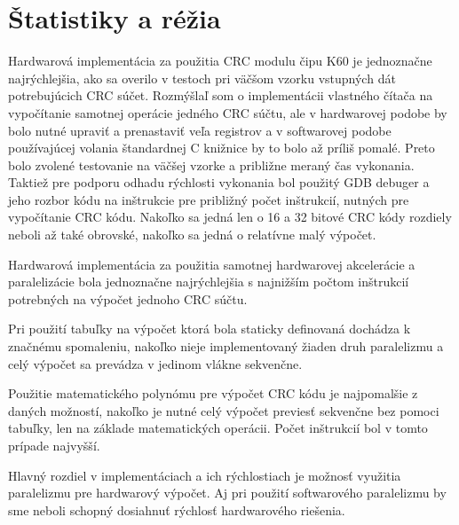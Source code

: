 \documentclass[../projekt.tex]{subfiles}
\begin{document}
\chapter{Štatistiky a réžia}
Hardwarová implementácia za použitia CRC modulu čipu K60 je jednoznačne najrýchlejšia, ako sa overilo v testoch pri väčšom vzorku vstupných dát potrebujúcich CRC súčet. Rozmýšlaľ som o implementácii vlastného čítača na vypočítanie samotnej operácie jedného CRC súčtu, ale v hardwarovej podobe by bolo nutné upraviť a prenastaviť veľa registrov a v softwarovej podobe používajúcej volania štandardnej C knižnice by to bolo až príliš pomalé. Preto bolo zvolené testovanie na väčšej vzorke a približne meraný čas vykonania. Taktiež pre podporu odhadu rýchlosti vykonania bol použitý GDB debuger a jeho rozbor kódu na inštrukcie pre približný počet inštrukcií, nutných pre vypočítanie CRC kódu. Nakoľko sa jedná len o 16 a 32 bitové CRC kódy rozdiely neboli až také obrovské, nakoľko sa jedná o relatívne malý výpočet.

Hardwarová implementácia za použitia samotnej hardwarovej akcelerácie a paralelizácie bola jednoznačne najrýchlejšia s najnižším počtom inštrukcií potrebných na výpočet jednoho CRC súčtu. 

Pri použití tabuľky na výpočet ktorá bola staticky definovaná dochádza k značnému spomaleniu, nakoľko nieje implementovaný žiaden druh paralelizmu a celý výpočet sa prevádza v jedinom vlákne sekvenčne.

Použitie matematického polynómu pre výpočet CRC kódu je najpomalšie z daných možností, nakoľko je nutné celý výpočet previesť sekvenčne bez pomoci tabuľky, len na základe matematických operácii. Počet inštrukcií bol v tomto prípade najvyšší.

Hlavný rozdiel v implementáciach a ich rýchlostiach je možnosť využitia paralelizmu pre hardwarový výpočet. Aj pri použití softwarového paralelizmu by sme neboli schopný dosiahnuť rýchlosť hardwarového riešenia.
\end{document}
